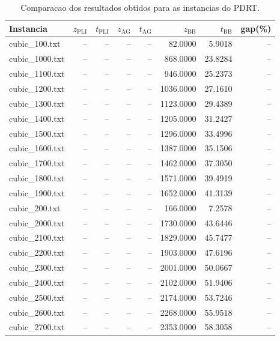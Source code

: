 \begin{table}[h!]
\centering
\caption{Comparacao dos resultados obtidos para as instancias do PDRT.}
\label{tab:comparacao-resultados}
\scriptsize
\setlength{\tabcolsep}{4pt}
\renewcommand{\arraystretch}{1.15}
\begin{tabular}{lrrrrrrr}
\hline
\textbf{Instancia} & \textbf{$z_{\mathrm{PLI}}$} & \textbf{$t_{\mathrm{PLI}}$} & \textbf{$z_{\mathrm{AG}}$} & \textbf{$t_{\mathrm{AG}}$} & \textbf{$z_{\mathrm{BB}}$} & \textbf{$t_{\mathrm{BB}}$} & \textbf{gap(\%)} \\
\hline
cubic_100.txt & -- & -- & -- & -- & 82.0000 & 5.9018 & -- \\
cubic_1000.txt & -- & -- & -- & -- & 868.0000 & 23.8284 & -- \\
cubic_1100.txt & -- & -- & -- & -- & 946.0000 & 25.2373 & -- \\
cubic_1200.txt & -- & -- & -- & -- & 1036.0000 & 27.1610 & -- \\
cubic_1300.txt & -- & -- & -- & -- & 1123.0000 & 29.4389 & -- \\
cubic_1400.txt & -- & -- & -- & -- & 1205.0000 & 31.2427 & -- \\
cubic_1500.txt & -- & -- & -- & -- & 1296.0000 & 33.4996 & -- \\
cubic_1600.txt & -- & -- & -- & -- & 1387.0000 & 35.1506 & -- \\
cubic_1700.txt & -- & -- & -- & -- & 1462.0000 & 37.3050 & -- \\
cubic_1800.txt & -- & -- & -- & -- & 1571.0000 & 39.4919 & -- \\
cubic_1900.txt & -- & -- & -- & -- & 1652.0000 & 41.3139 & -- \\
cubic_200.txt & -- & -- & -- & -- & 166.0000 & 7.2578 & -- \\
cubic_2000.txt & -- & -- & -- & -- & 1730.0000 & 43.6446 & -- \\
cubic_2100.txt & -- & -- & -- & -- & 1829.0000 & 45.7477 & -- \\
cubic_2200.txt & -- & -- & -- & -- & 1903.0000 & 47.6196 & -- \\
cubic_2300.txt & -- & -- & -- & -- & 2001.0000 & 50.0667 & -- \\
cubic_2400.txt & -- & -- & -- & -- & 2102.0000 & 51.9406 & -- \\
cubic_2500.txt & -- & -- & -- & -- & 2174.0000 & 53.7246 & -- \\
cubic_2600.txt & -- & -- & -- & -- & 2268.0000 & 55.9518 & -- \\
cubic_2700.txt & -- & -- & -- & -- & 2353.0000 & 58.3058 & -- \\

\end{tabular}
\end{table}
